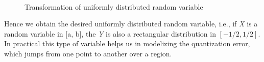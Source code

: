  \begin{figure}[!ht]
 \centering
 \quad
 \\
 \quad
 \caption{Transformation of uniformly distributed random variable}
\end{figure}
\noindent Hence we obtain the desired uniformly distributed random variable, i.e., if \textit{X} is a random variable in [a, b], the \textit{Y} is also a rectangular distribution in $[-1/2, 1/2].$ In practical this type of variable helps us in modelizing the quantization error, which jumps from one point to another over a region.

